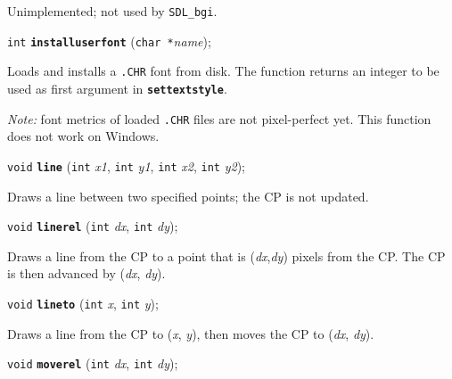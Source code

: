 \documentclass[a4paper,12pt]{article}
\newcommand{\SDLbgi}{\texttt{SDL\_bgi}}
\newcommand{\V}{\texttt{void}}      %
\newcommand{\I}{\texttt{int}}       %
\newcommand{\C}{\texttt{char *}}    %
\newcommand{\func}[1]{\textbf{\texttt{#1}}}  %
\newcommand{\A}[1]{\emph{#1}}       %
\newcommand{\file}[1]{\texttt{#1}}
\newenvironment{bgi}
{ %
  \begin{snugshade}
}
{ %
  \end{snugshade}
}
\begin{document}
Unimplemented; not used by \SDLbgi.


\label{sec:installuserfont}

\begin{bgi}
\I{} \func{installuserfont} (\C{}\A{name});
\end{bgi}

Loads and installs a \file{.CHR} font from disk. The function returns
an integer to be used as first argument in \func{settextstyle}.

\emph{Note:} font metrics of loaded \file{.CHR} files are not
pixel-perfect yet. This function does not work on Windows.


\label{sec:line}

\begin{bgi}
\V{} \func{line} (\I{} \A{x1}, \I{} \A{y1}, \I{} \A{x2}, \I{} \A{y2});
\end{bgi}

Draws a line between two specified points; the CP is not updated.


\label{sec:linerel}

\begin{bgi}
\V{} \func{linerel} (\I{} \A{dx}, \I{} \A{dy});
\end{bgi}

Draws a line from the CP to a point that is (\A{dx},\A{dy}) pixels
from the CP. The CP is then advanced by (\A{dx}, \A{dy}).


\label{sec:lineto}

\begin{bgi}
\V{} \func{lineto} (\I{} \A{x}, \I{} \A{y});
\end{bgi}

Draws a line from the CP to (\A{x}, \A{y}), then moves the CP to
(\A{dx}, \A{dy}).


\label{sec:moverel}

\begin{bgi}
\V{} \func{moverel} (\I{} \A{dx}, \I{} \A{dy});
\end{bgi}
\end{document}

